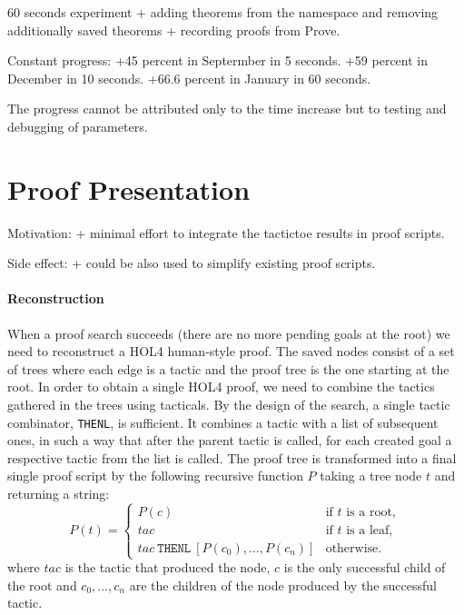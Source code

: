 \documentclass[runningheads,a4paper,draft]{svjour3}
\def\holfour{\textsf{HOL4}\xspace}
\begin{document}
60 seconds experiment + 
adding theorems from the namespace and removing 
additionally saved theorems + 
recording proofs from Prove.

Constant progress: 
+45 percent in Septermber in 5 seconds.
+59 percent in December in 10 seconds.
+66.6 percent in January in 60 seconds.
 
The progress cannot be attributed only to the time increase but to testing and 
debugging of parameters.

\section{Proof Presentation}\label{sec:proofdisplay}

Motivation: 
+ minimal effort to integrate the tactictoe results in proof scripts.

Side effect:
+ could be also used to simplify existing proof scripts. 

\paragraph{Reconstruction}
When a proof search succeeds (there are no more pending goals at the root)
we need to reconstruct a \holfour human-style proof.
The saved nodes consist of a set of trees where each edge is a tactic and
the proof tree is the one starting at the root.
In order to obtain a single \holfour proof, we need to combine the tactics
gathered in the trees using tacticals.
By the design of the search, a single tactic combinator, \texttt{THENL}, is 
sufficient. It combines a tactic with a list of subsequent ones, in such a way 
that after the parent tactic is called, for each created goal a respective 
tactic from the list is called.
The proof tree is transformed into a final single proof script
 by the following recursive function $P$ taking a
tree node $t$ and returning a string:
\begin{equation*}
P(t) =
\begin{cases}
P(c) & \text{if $t$ is a root},\\
tac & \text{if $t$ is a leaf},\\
tac\ \texttt{THENL}\ [P(c_0),\ldots,P(c_n)] & \text{otherwise.}
\end{cases}
\end{equation*}
where $tac$ is the tactic that produced the node, $c$ is the
only successful child of the root and $c_0, \ldots, c_n$ are the 
children of the node produced by the successful tactic.
\end{document}
